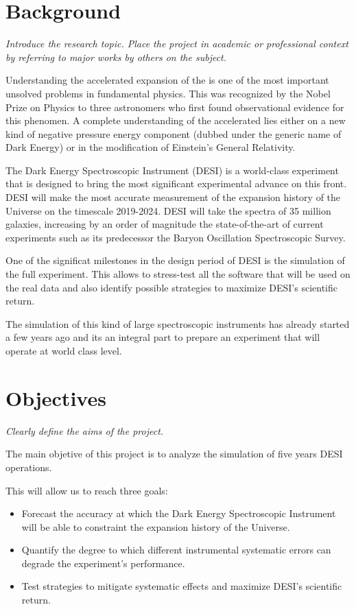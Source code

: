 \documentclass[12pt]{article}
\begin{document}
\section*{Background}
\textit{Introduce the research topic. Place the project in academic or
professional context by referring to major works by others on the
subject. }

Understanding the accelerated expansion of the is one of the most
important unsolved problems in fundamental physics.  
This was recognized by the Nobel Prize on Physics to three astronomers
who first found observational evidence for this phenomen.
A complete understanding of the accelerated lies either on a new kind
of negative pressure energy component (dubbed under the generic name
of Dark Energy) or in the modification of Einstein's General
Relativity. 

The Dark Energy Spectroscopic Instrument (DESI) is a world-class
experiment that is designed to bring the most significant experimental
advance on this front. 
DESI will make the most accurate measurement of the expansion history
of the Universe on the timescale 2019-2024. 
DESI will take the spectra of 35 million galaxies, increasing by an
order of magnitude the state-of-the-art of current experiments such as
its predecessor the Baryon Oscillation Spectroscopic Survey. 

One of the significat milestones in the design period of DESI is the
simulation of the full experiment. 
This allows to stress-test all the software that will be used on
the real data and also identify possible strategies to maximize DESI's
scientific return.  

The simulation of this kind of large spectroscopic instruments has
already started a few years ago and its an integral part to prepare an
experiment that will operate at world class level. 


\section*{Objectives}
\textit{Clearly define the aims of the project.}

The main objetive of this project is to analyze the simulation of five
years DESI operations.

This will allow us to reach three goals:
\begin{itemize}
\item Forecast the accuracy at which the Dark Energy Spectroscopic
  Instrument will be able to constraint the expansion history of the Universe. 
\item Quantify the degree to which different instrumental systematic
  errors can degrade the experiment's performance.
\item Test strategies to mitigate systematic effects and maximize
  DESI's scientific return.
\end{itemize}
\end{document}
